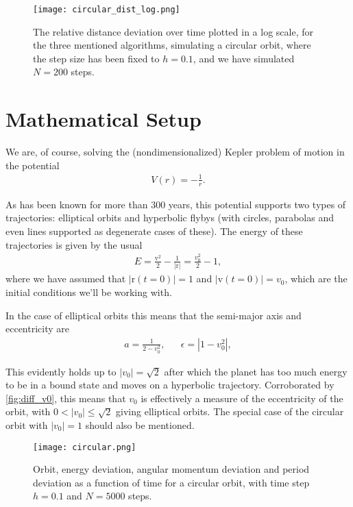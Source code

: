 \documentclass[10pt,a4paper,twocolumn]{article}
\renewcommand{\vec}[1]{\bm{\mathrm{#1}}}
\begin{document}
\begin{figure}[t]
    \centering
    \texttt{[image: circular\_dist\_log.png]}
    \caption{The relative distance deviation over time plotted in a log scale, for the three mentioned algorithms, simulating a circular orbit, where the step size has been fixed to $h=0.1$, and we have simulated $N=200$ steps.}
    \label{fig:circ_dist_log}
\end{figure}

\section{Mathematical Setup}

We are, of course, solving the (nondimensionalized) Kepler problem of motion in the potential
%
\begin{align}
    V (r) = - \frac{1}{r}.
\end{align}

As has been known for more than $300$ years, this potential supports two types of trajectories: elliptical orbits and hyperbolic flybys (with circles, parabolas and even lines supported as degenerate cases of these). The energy of these trajectories is given by the usual
%
\begin{align}
    E = \frac{\vec{v}^2}{2} - \frac{1}{|\vec{r}|} = \frac{v_0^2}{2} - 1,
\end{align} 
%
where we have assumed that $|\vec{r}(t=0)| = 1$ and $|\vec{v}(t=0)| = v_0$, which are the initial conditions we'll be working with.

In the case of elliptical orbits this means that the semi-major axis and eccentricity are
%
\begin{align}
    &a = \frac{1}{2 - v_0^2},& &\epsilon = |1 - v_0^2|,&
\end{align}

This evidently holds up to $|v_0| = \sqrt{2}$ after which the planet has too much energy to be in a bound state and moves on a hyperbolic trajectory. Corroborated by \cref{fig:diff_v0}, this means that $v_0$ is effectively a measure of the eccentricity of the orbit, with $0 < |v_0| \leq \sqrt{2}$ giving elliptical orbits. The special case of the circular orbit with $|v_0|=1$ should also be mentioned.

\begin{figure}
    \centering
    \texttt{[image: circular.png]}
    \caption{Orbit, energy deviation, angular momentum deviation and period deviation as a function of time for a circular orbit, with time step $h=0.1$ and $N=5000$ steps.}
    \label{fig:circ}
\end{figure}
\end{document}
